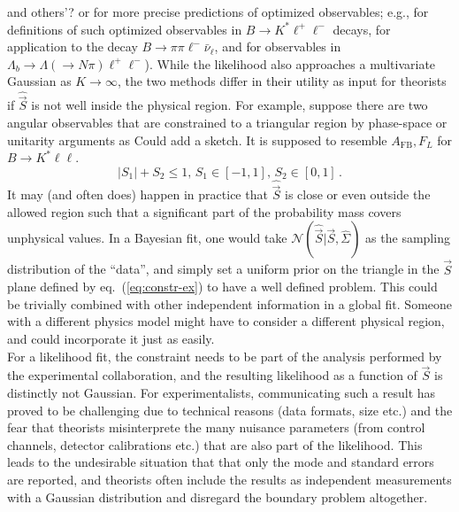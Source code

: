 \documentclass[aps,prd,reprint,nofootinbib,preprintnumbers]{revtex4}
\newcommand{\refeq}[1]{eq.~(\ref{eq:#1})}
\newcommand{\vecest}[1]{\widehat{\vec{#1}}}
\newcommand{\fred}[1]{{\color{brown!85!black}#1}}
\begin{document}
\begin{enumerate}
{    and others'?} or for more precise predictions of optimized
  observables; e.g.,
  \cite{Egede:2008uy,Egede:2010zc,Bobeth:2010wg,Becirevic:2011bp,
    Bobeth:2012vn,Matias:2012xw,DescotesGenon:2012zf} for definitions
  of such optimized observables in $B\to K^*\ell^+\ell^-$ decays,
  \cite{Faller:2013dwa} for application to the decay $B\to
  \pi\pi\ell^-\bar\nu_\ell$, and \cite{Boeer:2014xx} for observables
  in $\Lambda_b\to\Lambda(\to N\pi)\ell^+\ell^-$). While the
  likelihood also approaches a multivariate Gaussian as $K \to
  \infty$, the two methods differ in their utility as input for
  theorists if $\widehat{\vec{S}}$ is not well
  inside the physical region. For example, suppose there are two
  angular observables that are constrained to a triangular region by
  phase-space or unitarity arguments as \fred{Could add a sketch. It
    is supposed to resemble $A_{\text{FB}},F_L$ for $B \to K^* \ell
    \ell$.}
  \begin{equation}
    \label{eq:constr-ex}
    |S_1| + S_2 \le 1, \, S_1 \in [-1,1],\, S_2 \in [0,1] \,.
  \end{equation}
  It may (and often does) happen in practice that $\widehat{\vec{S}}$
  is close or even outside the allowed region such that a significant
  part of the probability mass covers unphysical values. In a Bayesian
  fit, one would take $\mathcal{N}(\vecest{S} | \vec{S},
  \widehat{\Sigma})$ as the sampling distribution of the ``data'', and
  simply set a uniform prior on the triangle in the $\vec{S}$ plane
  defined by \refeq{constr-ex} to have a well defined problem. This
  could be trivially combined with other independent information in a
  global fit. Someone with a different physics model might have to
  consider a
  different physical region, and could incorporate it just as easily.\\

  For a likelihood fit, the constraint needs to be part of the
  analysis performed by the experimental collaboration, and the
  resulting likelihood as a function of $\vec{S}$ is distinctly not
  Gaussian.  For experimentalists, communicating such a result has
  proved to be challenging due to technical reasons (data formats,
  size etc.) and the fear that theorists misinterprete the many
  nuisance parameters (from control channels, detector calibrations
  etc.) that are also part of the likelihood. This leads to the
  undesirable situation that that only the mode and standard errors
  are reported, and theorists often include the results as independent
  measurements with a Gaussian distribution and disregard the boundary
  problem altogether.

\end{enumerate}
\end{document}
